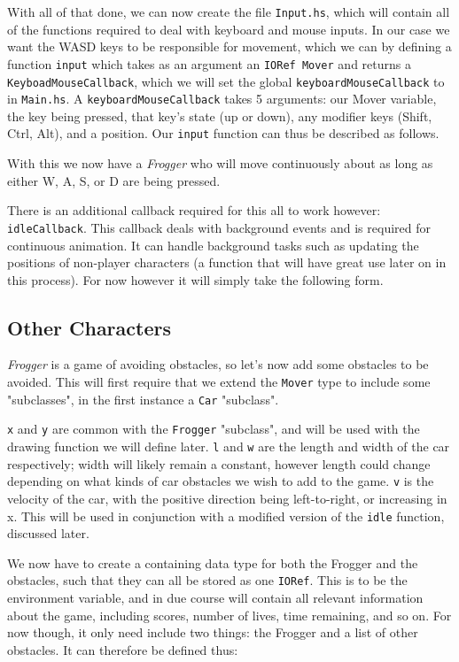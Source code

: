 \documentclass[12pt, a4paper]{report}
\begin{document}
\par

With all of that done, we can now create the file \verb|Input.hs|, which will contain all of the functions required to deal with keyboard and mouse inputs.
In our case we want the WASD keys to be responsible for movement, which we can by defining a function \verb|input| which takes as an argument an \verb|IORef Mover| and returns a \verb|KeyboadMouseCallback|, which we will set the global \verb|keyboardMouseCallback| to in \verb|Main.hs|.
A \verb|keyboardMouseCallback| takes 5 arguments: our Mover variable, the key being pressed, that key's state (up or down), any modifier keys (Shift, Ctrl, Alt), and a position.
Our \verb|input| function can thus be described as follows.

With this we now have a \textit{Frogger} who will move continuously about as long as either W, A, S, or D are being pressed.

There is an additional callback required for this all to work however: \verb|idleCallback|.
This callback deals with background events and is required for continuous animation.
It can handle background tasks such as updating the positions of non-player characters (a function that will have great use later on in this process).
For now however it will simply take the following form.

\subsection{Other Characters}

\textit{Frogger} is a game of avoiding obstacles, so let's now add some obstacles to be avoided.
This will first require that we extend the \verb|Mover| type to include some "subclasses", in the first instance a \verb|Car| "subclass".

\verb|x| and \verb|y| are common with the \verb|Frogger| "subclass", and will be used with the drawing function we will define later.
\verb|l| and \verb|w| are the length and width of the car respectively; width will likely remain a constant, however length could change depending on what kinds of car obstacles we wish to add to the game.
\verb|v| is the velocity of the car, with the positive direction being left-to-right, or increasing in x.
This will be used in conjunction with a modified version of the \verb|idle| function, discussed later.


We now have to create a containing data type for both the Frogger and the obstacles, such that they can all be stored as one \verb|IORef|.
This is to be the environment variable, and in due course will contain all relevant information about the game, including scores, number of lives, time remaining, and so on.
For now though, it only need include two things: the Frogger and a list of other obstacles.
It can therefore be defined thus:
\end{document}
